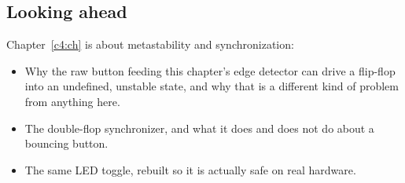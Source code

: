 \subsection*{Looking ahead}
Chapter~\ref{c4:ch} is about metastability and synchronization:
\begin{itemize}
  \item Why the raw button feeding this chapter's edge detector can drive a flip-flop into an
    undefined, unstable state, and why that is a different kind of problem from anything here.
  \item The double-flop synchronizer, and what it does and does not do about a bouncing button.
  \item The same LED toggle, rebuilt so it is actually safe on real hardware.
\end{itemize}
